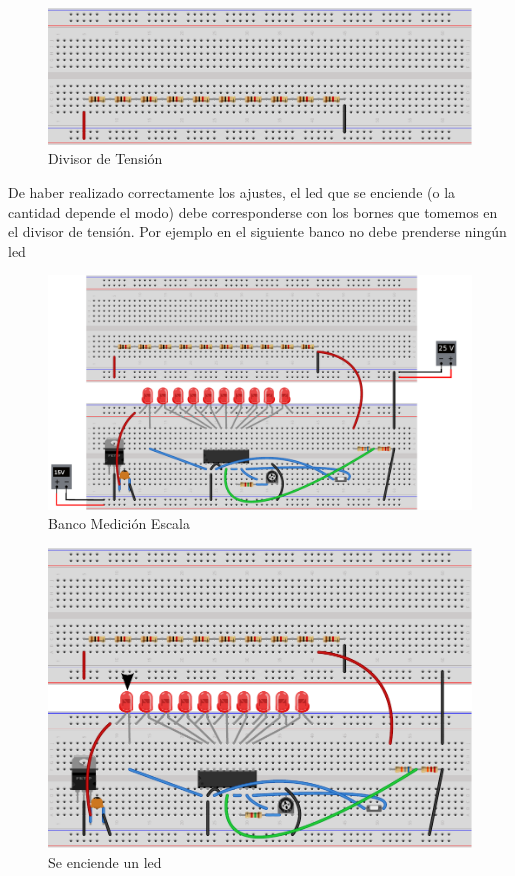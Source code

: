 \documentclass[12pt,a4paper]{article}
\begin{document}
			\begin{figure}[H]
			\centering
				\includegraphics[scale=1]{images/div.pdf}\caption{Divisor de Tensión}\label{fig:divtens}
			\end{figure}

			De haber realizado correctamente los ajustes, el led que se enciende (o la cantidad depende el modo) debe corresponderse con los bornes que tomemos en el divisor de tensión. Por ejemplo en el siguiente banco no debe prenderse ningún led
			
			\begin{figure}[H]
			\centering
				\includegraphics[scale=0.8]{images/labo1_bb3.pdf}\caption{Banco Medición Escala}
			\end{figure}

			\begin{figure}[H]
			\centering
				\includegraphics[scale=0.9]{images/labo1_bb2.pdf}\caption{Se enciende un led}
			\end{figure}
\end{document}
